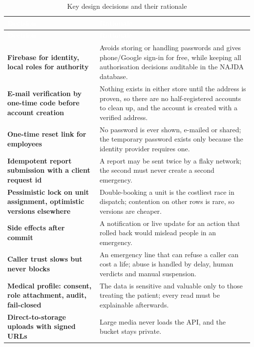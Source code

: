 {\tabfont\rowband
\begin{longtable}{@{}>{\raggedright\arraybackslash}p{}>{\raggedright\arraybackslash}p{}@{}}
\caption{Key design decisions and their rationale}\label{tab:decisions}\\
\rowcolor{najdanavy}\textcolor{white}{\sffamily\bfseries\small Decision} & \textcolor{white}{\sffamily\bfseries\small Rationale}\\
\endfirsthead
\rowcolor{najdanavy}\textcolor{white}{\sffamily\bfseries\small Decision} & \textcolor{white}{\sffamily\bfseries\small Rationale}\\
\endhead
\bottomrule\endlastfoot
\textbf{Firebase for identity, local roles for authority} & Avoids storing or handling passwords and gives phone/\allowbreak{}Google sign-in for free, while keeping all authorisation decisions auditable in the NAJDA database.\\
\textbf{E-mail verification by one-time code before account creation} & Nothing exists in either store until the address is proven, so there are no half-registered accounts to clean up, and the account is created with a verified address.\\
\textbf{One-time reset link for employees} & No password is ever shown, e-mailed or shared; the temporary password exists only because the identity provider requires one.\\
\textbf{Idempotent report submission with a client request id} & A report may be sent twice by a flaky network; the second must never create a second emergency.\\
\textbf{Pessimistic lock on unit assignment, optimistic versions elsewhere} & Double-booking a unit is the costliest race in dispatch; contention on other rows is rare, so versions are cheaper.\\
\textbf{Side effects after commit} & A notification or live update for an action that rolled back would mislead people in an emergency.\\
\textbf{Caller trust slows but never blocks} & An emergency line that can refuse a caller can cost a life; abuse is handled by delay, human verdicts and manual suspension.\\
\textbf{Medical profile: consent, role attachment, audit, fail-closed} & The data is sensitive and valuable only to those treating the patient; every read must be explainable afterwards.\\
\textbf{Direct-to-storage uploads with signed URLs} & Large media never loads the API, and the bucket stays private.\\

\end{longtable}}
